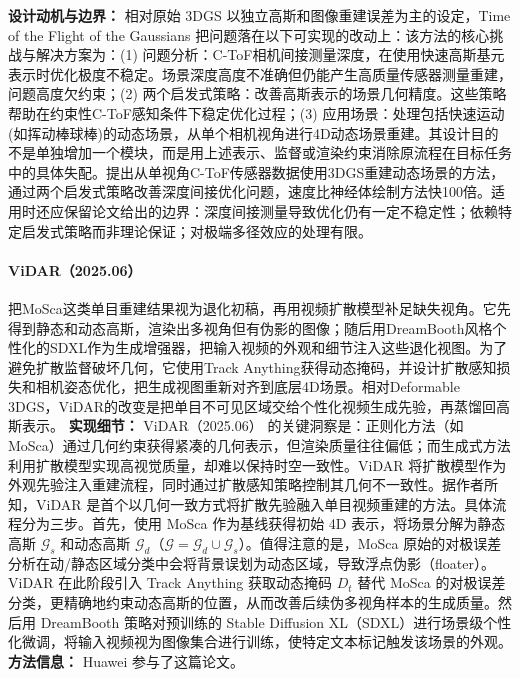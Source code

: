 \textbf{设计动机与边界：} 相对原始 3DGS 以独立高斯和图像重建误差为主的设定，Time of the Flight of the Gaussians 把问题落在以下可实现的改动上：该方法的核心挑战与解决方案为：(1) 问题分析：C-ToF相机间接测量深度，在使用快速高斯基元表示时优化极度不稳定。场景深度高度不准确但仍能产生高质量传感器测量重建，问题高度欠约束；(2) 两个启发式策略：改善高斯表示的场景几何精度。这些策略帮助在约束性C-ToF感知条件下稳定优化过程；(3) 应用场景：处理包括快速运动(如挥动棒球棒)的动态场景，从单个相机视角进行4D动态场景重建。其设计目的不是单独增加一个模块，而是用上述表示、监督或渲染约束消除原流程在目标任务中的具体失配。提出从单视角C-ToF传感器数据使用3DGS重建动态场景的方法，通过两个启发式策略改善深度间接优化问题，速度比神经体绘制方法快100倍。适用时还应保留论文给出的边界：深度间接测量导致优化仍有一定不稳定性；依赖特定启发式策略而非理论保证；对极端多径效应的处理有限。
\paragraph{ViDAR（2025.06）\cite{2506_18792}}
把MoSca这类单目重建结果视为退化初稿，再用视频扩散模型补足缺失视角。它先得到静态和动态高斯，渲染出多视角但有伪影的图像；随后用DreamBooth风格个性化的SDXL作为生成增强器，把输入视频的外观和细节注入这些退化视图。为了避免扩散监督破坏几何，它使用Track Anything获得动态掩码，并设计扩散感知损失和相机姿态优化，把生成视图重新对齐到底层4D场景。相对Deformable 3DGS，ViDAR的改变是把单目不可见区域交给个性化视频生成先验，再蒸馏回高斯表示。
\textbf{实现细节：} ViDAR（2025.06） 的关键洞察是：正则化方法（如 MoSca）通过几何约束获得紧凑的几何表示，但渲染质量往往偏低；而生成式方法利用扩散模型实现高视觉质量，却难以保持时空一致性。ViDAR 将扩散模型作为外观先验注入重建流程，同时通过扩散感知策略控制其几何不一致性。据作者所知，ViDAR 是首个以几何一致方式将扩散先验融入单目视频重建的方法。具体流程分为三步。首先，使用 MoSca 作为基线获得初始 4D 表示，将场景分解为静态高斯 $\mathcal{G}_s$ 和动态高斯 $\mathcal{G}_d$（$\mathcal{G} = \mathcal{G}_d \cup \mathcal{G}_s$）。值得注意的是，MoSca 原始的对极误差分析在动/静态区域分类中会将背景误划为动态区域，导致浮点伪影（floater）。ViDAR 在此阶段引入 Track Anything 获取动态掩码 $D_t$ 替代 MoSca 的对极误差分类，更精确地约束动态高斯的位置，从而改善后续伪多视角样本的生成质量。然后用 DreamBooth 策略对预训练的 Stable Diffusion XL（SDXL）进行场景级个性化微调，将输入视频视为图像集合进行训练，使特定文本标记触发该场景的外观。
\textbf{方法信息：} Huawei 参与了这篇论文。



